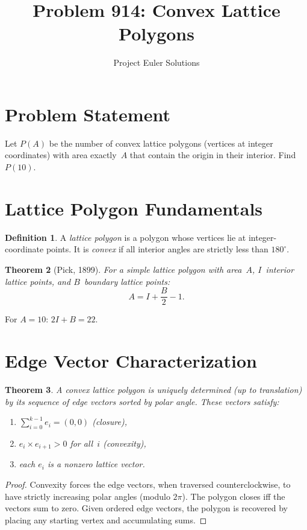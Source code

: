 \documentclass[11pt]{article}
\title{Problem 914: Convex Lattice Polygons}
\author{Project Euler Solutions}
\date{}
\newtheorem{theorem}{Theorem}
\theoremstyle{definition}
\newtheorem{definition}[theorem]{Definition}
\begin{document}
\maketitle

\section{Problem Statement}

Let $P(A)$ be the number of convex lattice polygons (vertices at integer coordinates) with area exactly~$A$ that contain the origin in their interior. Find~$P(10)$.

\section{Lattice Polygon Fundamentals}

\begin{definition}
A \emph{lattice polygon} is a polygon whose vertices lie at integer-coordinate points. It is \emph{convex} if all interior angles are strictly less than $180^\circ$.
\end{definition}

\begin{theorem}[Pick, 1899]
For a simple lattice polygon with area~$A$, $I$~interior lattice points, and $B$~boundary lattice points:
\[
A = I + \frac{B}{2} - 1.
\]
\end{theorem}

For $A = 10$: $2I + B = 22$.

\section{Edge Vector Characterization}

\begin{theorem}
A convex lattice polygon is uniquely determined (up to translation) by its sequence of edge vectors sorted by polar angle. These vectors satisfy:
\begin{enumerate}
    \item $\sum_{i=0}^{k-1} e_i = (0,0)$ \quad (closure),
    \item $e_i \times e_{i+1} > 0$ for all~$i$ \quad (convexity),
    \item each $e_i$ is a nonzero lattice vector.
\end{enumerate}
\end{theorem}

\begin{proof}
Convexity forces the edge vectors, when traversed counterclockwise, to have strictly increasing polar angles (modulo $2\pi$). The polygon closes iff the vectors sum to zero. Given ordered edge vectors, the polygon is recovered by placing any starting vertex and accumulating sums.
\end{proof}
\end{document}
